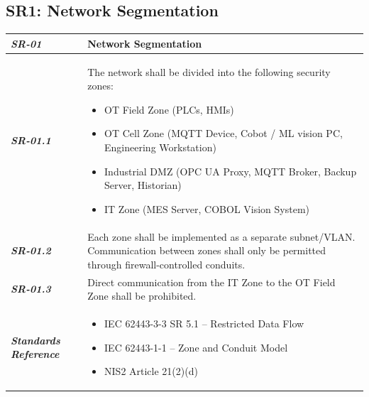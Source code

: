 \documentclass[11pt,a4paper]{article}
\begin{document}
\subsection{SR1: Network Segmentation}\label{SR1}
\begin{tabularx}
{\textwidth}{>{\bfseries}p{2.5cm} X}
\textit{SR-01} & \textbf{Network Segmentation} \vspace{0.5em}\\
\toprule
\textit{SR-01.1} &
The network shall be divided into the following security zones:
\begin{itemize}[label=-, itemsep=0pt, topsep=2pt]
    \item OT Field Zone (PLCs, HMIs)
    \item OT Cell Zone (MQTT Device, Cobot / ML vision PC, Engineering Workstation)
    \item Industrial DMZ (OPC UA Proxy, MQTT Broker, Backup Server, Historian)
    \item IT Zone (MES Server, COBOL Vision System)
\end{itemize} \vspace{0.5em}
\\
\textit{SR-01.2} &
Each zone shall be implemented as a separate subnet/VLAN.
Communication between zones shall only be permitted through
    firewall-controlled conduits. \vspace{0.5em}
\\
\textit{SR-01.3} &
Direct communication from the IT Zone to the OT Field Zone
    shall be prohibited. \vspace{0.5em}
\\
\midrule
    \textit{Standards Reference} &
\begin{itemize}[label=-, noitemsep, topsep=0pt, leftmargin=*]
    \item IEC 62443-3-3 SR 5.1 -- Restricted Data Flow
    \item IEC 62443-1-1 -- Zone and Conduit Model
    \item NIS2 Article 21(2)(d)
\end{itemize} \vspace{1em} \\ 
\end{tabularx}
\vspace{2em}

\end{document}

